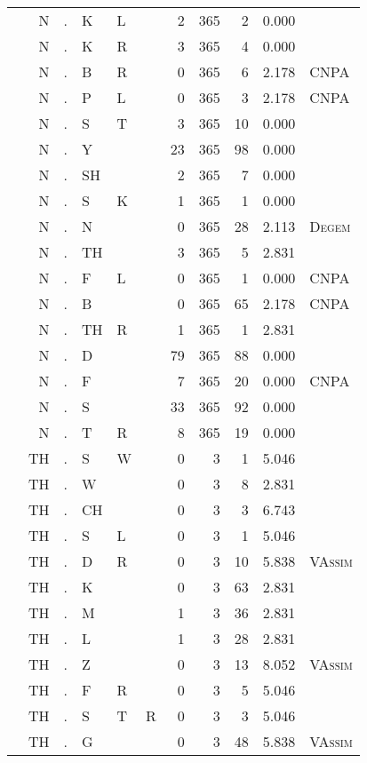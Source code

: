 \begin{longtable}{r@{ } r@{ } c@{ } l@{ } l@{ } l@{ } r r r r l }
 & N & . & K & L &  & 2 & 365 & 2 & 0.000 &  \\
 & N & . & K & R &  & 3 & 365 & 4 & 0.000 &  \\
 & N & . & B & R &  & 0 & 365 & 6 & 2.178 & \textsc{CNPA} \\
 & N & . & P & L &  & 0 & 365 & 3 & 2.178 & \textsc{CNPA} \\
 & N & . & S & T &  & 3 & 365 & 10 & 0.000 &  \\
 & N & . & Y &  &  & 23 & 365 & 98 & 0.000 &  \\
 & N & . & SH &  &  & 2 & 365 & 7 & 0.000 &  \\
 & N & . & S & K &  & 1 & 365 & 1 & 0.000 &  \\
 & N & . & N &  &  & 0 & 365 & 28 & 2.113 & \textsc{Degem} \\
 & N & . & TH &  &  & 3 & 365 & 5 & 2.831 &  \\
 & N & . & F & L &  & 0 & 365 & 1 & 0.000 & \textsc{CNPA} \\
 & N & . & B &  &  & 0 & 365 & 65 & 2.178 & \textsc{CNPA} \\
 & N & . & TH & R &  & 1 & 365 & 1 & 2.831 &  \\
 & N & . & D &  &  & 79 & 365 & 88 & 0.000 &  \\
 & N & . & F &  &  & 7 & 365 & 20 & 0.000 & \textsc{CNPA} \\
 & N & . & S &  &  & 33 & 365 & 92 & 0.000 &  \\
 & N & . & T & R &  & 8 & 365 & 19 & 0.000 &  \\
 & TH & . & S & W &  & 0 & 3 & 1 & 5.046 &  \\
 & TH & . & W &  &  & 0 & 3 & 8 & 2.831 &  \\
 & TH & . & CH &  &  & 0 & 3 & 3 & 6.743 &  \\
 & TH & . & S & L &  & 0 & 3 & 1 & 5.046 &  \\
 & TH & . & D & R &  & 0 & 3 & 10 & 5.838 & \textsc{VAssim} \\
 & TH & . & K &  &  & 0 & 3 & 63 & 2.831 &  \\
 & TH & . & M &  &  & 1 & 3 & 36 & 2.831 &  \\
 & TH & . & L &  &  & 1 & 3 & 28 & 2.831 &  \\
 & TH & . & Z &  &  & 0 & 3 & 13 & 8.052 & \textsc{VAssim} \\
 & TH & . & F & R &  & 0 & 3 & 5 & 5.046 &  \\
 & TH & . & S & T & R & 0 & 3 & 3 & 5.046 &  \\
 & TH & . & G &  &  & 0 & 3 & 48 & 5.838 & \textsc{VAssim} \\

\end{longtable}
